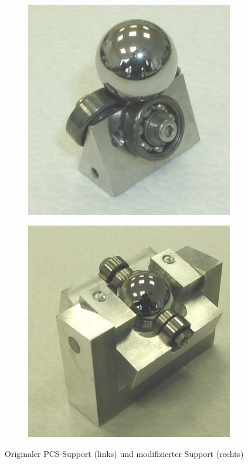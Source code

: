 \begin{figure}[htb]
    \begin{subfigure}[b]{0.3\textwidth}
        \includegraphics[width=\textwidth]{./images/kugel-support_original.png}
    \end{subfigure}
    \begin{subfigure}[b]{0.3\textwidth}
        \includegraphics[width=\textwidth]{./images/kugel-support_wittek.png}
    \end{subfigure}
    \caption{Originaler PCS-Support (links) und modifizierter Support (rechts) \cite{wittek_2007}}
    \label{fig:kugel_support}
\end{figure}
%

